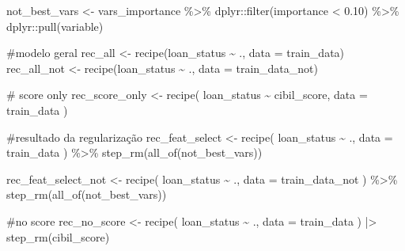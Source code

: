 \documentclass[
  letterpaper,
  DIV=11,
  numbers=noendperiod]{scrartcl}
\newenvironment{Shaded}{\begin{snugshade}}{\end{snugshade}}
\newcommand{\AttributeTok}[1]{\textcolor[rgb]{0.40,0.45,0.13}{#1}}
\newcommand{\CommentTok}[1]{\textcolor[rgb]{0.37,0.37,0.37}{#1}}
\newcommand{\FloatTok}[1]{\textcolor[rgb]{0.68,0.00,0.00}{#1}}
\newcommand{\FunctionTok}[1]{\textcolor[rgb]{0.28,0.35,0.67}{#1}}
\newcommand{\NormalTok}[1]{\textcolor[rgb]{0.00,0.23,0.31}{#1}}
\newcommand{\OtherTok}[1]{\textcolor[rgb]{0.00,0.23,0.31}{#1}}
\newcommand{\SpecialCharTok}[1]{\textcolor[rgb]{0.37,0.37,0.37}{#1}}
\begin{document}
\begin{Shaded}
\begin{Highlighting}[]
\NormalTok{not\_best\_vars }\OtherTok{\textless{}{-}}\NormalTok{ vars\_importance }\SpecialCharTok{\%\textgreater{}\%}
\NormalTok{  dplyr}\SpecialCharTok{::}\FunctionTok{filter}\NormalTok{(importance }\SpecialCharTok{\textless{}} \FloatTok{0.10}\NormalTok{) }\SpecialCharTok{\%\textgreater{}\%}
\NormalTok{  dplyr}\SpecialCharTok{::}\FunctionTok{pull}\NormalTok{(variable)}
\end{Highlighting}
\end{Shaded}

\begin{Shaded}
\begin{Highlighting}[]
\CommentTok{\#modelo geral}
\NormalTok{rec\_all }\OtherTok{\textless{}{-}} \FunctionTok{recipe}\NormalTok{(loan\_status }\SpecialCharTok{\textasciitilde{}}\NormalTok{ ., }\AttributeTok{data =}\NormalTok{ train\_data)}
\NormalTok{rec\_all\_not }\OtherTok{\textless{}{-}} \FunctionTok{recipe}\NormalTok{(loan\_status }\SpecialCharTok{\textasciitilde{}}\NormalTok{ ., }\AttributeTok{data =}\NormalTok{ train\_data\_not)}

\CommentTok{\# score only}
\NormalTok{rec\_score\_only }\OtherTok{\textless{}{-}} \FunctionTok{recipe}\NormalTok{(}
\NormalTok{  loan\_status }\SpecialCharTok{\textasciitilde{}}\NormalTok{ cibil\_score,}
  \AttributeTok{data =}\NormalTok{ train\_data}
\NormalTok{)}

\CommentTok{\#resultado da regularização}
\NormalTok{rec\_feat\_select }\OtherTok{\textless{}{-}} \FunctionTok{recipe}\NormalTok{(}
\NormalTok{  loan\_status }\SpecialCharTok{\textasciitilde{}}\NormalTok{ .,}
  \AttributeTok{data =}\NormalTok{ train\_data}
\NormalTok{) }\SpecialCharTok{\%\textgreater{}\%}
  \FunctionTok{step\_rm}\NormalTok{(}\FunctionTok{all\_of}\NormalTok{(not\_best\_vars))}

\NormalTok{rec\_feat\_select\_not }\OtherTok{\textless{}{-}} \FunctionTok{recipe}\NormalTok{(}
\NormalTok{  loan\_status }\SpecialCharTok{\textasciitilde{}}\NormalTok{ .,}
  \AttributeTok{data =}\NormalTok{ train\_data\_not}
\NormalTok{) }\SpecialCharTok{\%\textgreater{}\%}
  \FunctionTok{step\_rm}\NormalTok{(}\FunctionTok{all\_of}\NormalTok{(not\_best\_vars))}

\CommentTok{\#no score}
\NormalTok{rec\_no\_score }\OtherTok{\textless{}{-}} \FunctionTok{recipe}\NormalTok{(}
\NormalTok{  loan\_status }\SpecialCharTok{\textasciitilde{}}\NormalTok{ .,}
  \AttributeTok{data =}\NormalTok{ train\_data}
\NormalTok{) }\SpecialCharTok{|\textgreater{}}
  \FunctionTok{step\_rm}\NormalTok{(cibil\_score)}


\end{Highlighting}
\end{Shaded}
\end{document}
